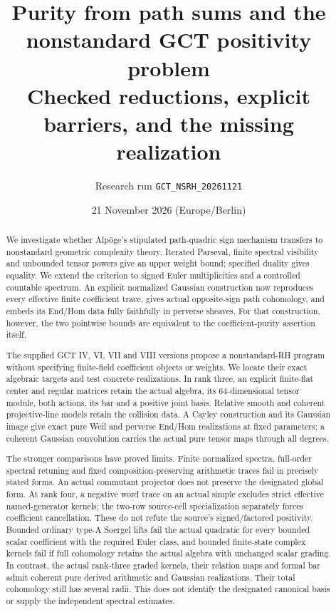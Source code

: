 \documentclass[11pt,a4paper]{article}
\title{Purity from path sums and the nonstandard GCT positivity problem\\[4pt]\large Checked reductions, explicit barriers, and the missing realization}
\author{Research run \texttt{GCT\_NSRH\_20261121}}
\date{21 November 2026 (Europe/Berlin)}
\theoremstyle{named}\newtheorem{finding}{Finding}[section]
\theoremstyle{definition}\newtheorem{definition}[finding]{Definition}
\theoremstyle{remark}\newtheorem{remark}[finding]{Remark}
\begin{document}
\maketitle
\begin{abstract}
We investigate whether Alp\"oge's stipulated path-quadric sign mechanism transfers to nonstandard geometric complexity theory. Iterated Parseval, finite spectral visibility and unbounded tensor powers give an upper weight bound; specified duality gives equality. We extend the criterion to signed Euler multiplicities and a controlled countable spectrum. An explicit normalized Gaussian construction now reproduces every effective finite coefficient trace, gives actual opposite-sign path cohomology, and embeds its End/Hom data fully faithfully in perverse sheaves. For that construction, however, the two pointwise bounds are equivalent to the coefficient-purity assertion itself.

The supplied GCT IV, VI, VII and VIII versions propose a nonstandard-RH program without specifying finite-field coefficient objects or weights. We locate their exact algebraic targets and test concrete realizations. In rank three, an explicit finite-flat center and regular matrices retain the actual algebra, its 64-dimensional tensor module, both actions, its bar and a positive joint basis. Relative smooth and coherent projective-line models retain the collision data. A Cayley construction and its Gaussian image give exact pure Weil and perverse End/Hom realizations at fixed parameters; a coherent Gaussian convolution carries the actual pure tensor maps through all degrees.

The stronger comparisons have proved limits. Finite normalized spectra, full-order spectral retuning and fixed composition-preserving arithmetic traces fail in precisely stated forms. An actual commutant projector does not preserve the designated global form. At rank four, a negative word trace on an actual simple excludes strict effective named-generator kernels; the two-row source-cell specialization separately forces coefficient cancellation. These do not refute the source's signed/factored positivity. Bounded ordinary type-A Soergel lifts fail the actual quadratic for every bounded scalar coefficient with the required Euler class, and bounded finite-state complex kernels fail if full cohomology retains the actual algebra with unchanged scalar grading. In contrast, the actual rank-three graded kernels, their relation maps and formal bar admit coherent pure derived arithmetic and Gaussian realizations. Their total cohomology still has several radii. This does not identify the designated canonical basis or supply the independent spectral estimates.


\end{abstract}
\end{document}
